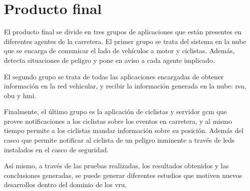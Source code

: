 \chapter{Producto final}
El producto final se divide en tres grupos de aplicaciones que están presentes en diferentes
agentes de la carretera. El primer grupo se trata del sistema en la nube que se encarga de
comunicar el lado de vehículos a motor y ciclistas. Además, detecta situaciones de peligro
y pone en aviso a cada agente implicado.

El segundo grupo se trata de todas las aplicaciones encargadas de obtener información en la
red vehicular, y recibir la información generada en la nube: \gls{rsu}, \gls{obu} y \gls{hmi}.

Finalmente, el último grupo es la aplicación de ciclistas y servidor \gls{gcm} que provee
notificaciones a los ciclistas sobre los eventos en carretera, y al mismo tiempo permite a
los ciclistas mandar información sobre su posición. Además del casco  que permite
notificar al ciclista de un peligro inminente a través de leds instalados en el casco de
seguridad.

Así mismo, a través de las pruebas realizadas, los resultados obtenidos y las conclusiones
generadas, se puede generar diferentes estudios que motiven nuevos desarrollos dentro del
dominio de los \gls{vru}.
